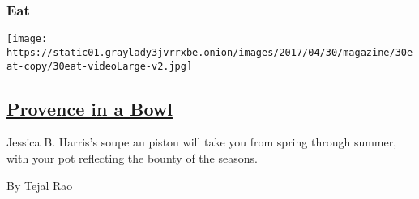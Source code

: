 \begin{enumerate}
{  \subsubsection{Eat}\label{eat}}

  \texttt{[image: https://static01.graylady3jvrrxbe.onion/images/2017/04/30/magazine/30eat-copy/30eat-videoLarge-v2.jpg]}

  \hypertarget{provence-in-a-bowl}{%
  \subsection{\texorpdfstring{\href{/2017/04/27/magazine/provence-in-a-bowl.html}{Provence
  in a Bowl}}{Provence in a Bowl}}\label{provence-in-a-bowl}}

  Jessica B. Harris's soupe au pistou will take you from spring through
  summer, with your pot reflecting the bounty of the seasons.

  By Tejal Rao
\end{enumerate}

